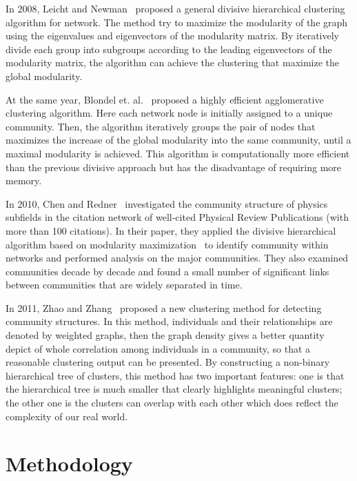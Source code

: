\documentclass{article} %
\begin{document}
In 2008, Leicht and Newman~\cite{Newman_divisive} proposed a general divisive hierarchical clustering algorithm for network. The method try to maximize the modularity of the graph using the eigenvalues and eigenvectors of the modularity matrix. By iteratively divide each group into subgroups according to the leading eigenvectors of the modularity matrix, the algorithm can achieve the clustering that maximize the global modularity. 

At the same year, Blondel et. al.~\cite{bottom_up} proposed a highly efficient agglomerative clustering algorithm. Here each network node is initially assigned to a unique community. Then, the algorithm iteratively groups the pair of nodes that maximizes the increase of the global modularity into the same community, until a maximal modularity is achieved. This algorithm is computationally more efficient than the previous divisive approach but has the disadvantage of requiring more memory. 

In 2010, Chen and Redner~\cite{phys_rev} investigated the community structure of physics subfields in the citation network of well-cited Physical Review Publications (with more than 100 citations). In their paper, they applied the divisive hierarchical algorithm based on modularity maximization~\cite{Newman_divisive} to identify community within networks and performed analysis on the major communities. They also examined communities decade by decade and found a small number of significant links between communities that are widely separated in time. 

In 2011, Zhao and Zhang~\cite{new_method} proposed a new clustering method for detecting community structures. In this method, individuals and their relationships are denoted by weighted graphs, then the graph density gives a better quantity depict of whole correlation among individuals in a community, so that a reasonable clustering output can be presented. By constructing a non-binary hierarchical tree of clusters, this method has two important features: one is that the hierarchical tree is much smaller that clearly highlights meaningful clusters; the other one is the clusters can overlap with each other which does reflect the complexity of our real world.


\section{Methodology}
\label{method}
\end{document}
